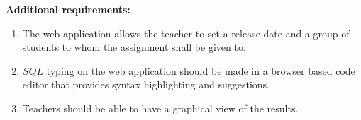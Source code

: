 \textbf{Additional requirements:}
\begin{enumerate}[resume,label=R-OPT-\arabic*]
  \item The web application allows the teacher to set a release date and a group
  of students to whom the assignment shall be given to.
  \item $SQL$ typing on the web application should be made in a browser based
  code editor that provides syntax highlighting and suggestions.
  \item Teachers should be able to have a graphical view of the results.
\end{enumerate}
